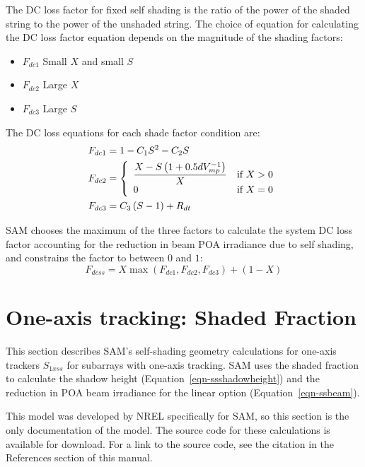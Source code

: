 \documentclass[12pt,letterpaper]{article}
\begin{document}
The DC loss factor for fixed self shading is the ratio of the power of the shaded string to the power of the unshaded string. The choice of equation for calculating the DC loss factor equation depends on the magnitude of the shading factors:
\begin{itemize}
\item $F_{dc1}$ \quad Small $X$ and small $S$
\item $F_{dc2}$ \quad Large $X$
\item $F_{dc3}$ \quad Large $S$
\end{itemize}

The DC loss equations for each shade factor condition are:
\begin{align}
F_{dc1} &= 1-C_1S^2-C_2S \notag\\ %
F_{dc2} &= 
\left\{
   \begin{array}{ll}
      \dfrac{X-S\left(1+0.5 d V^{-1}_{mp}\right)}{X} & \text{if $X>0$}\\
      0 & \text{if $X=0$}\\
   \end{array}
\right. \notag\\ %
F_{dc3} &= C_3\left(S-1\right)+R_{dt} %
\end{align}

SAM chooses the maximum of the three factors to calculate the system DC loss factor accounting for the reduction in beam POA irradiance due to self shading, and constrains the factor to between $0$ and $1$:
\begin{equation}\label{eqn-selfshadedcderate}
F_{dcss}=X\max\left(F_{dc1},F_{dc2},F_{dc3}\right)+(1-X)
\end{equation}

\section{One-axis tracking: Shaded Fraction}\label{sec_selfshad1x}

This section describes SAM's self-shading geometry calculations for one-axis trackers $S_{1xss}$ for subarrays with one-axis tracking. SAM uses the shaded fraction to calculate the shadow height (Equation~\ref{eqn-ssshadowheight}) and the reduction in POA beam irradiance for the linear option (Equation~\ref{eqn-ssbeam}).

This model was developed by NREL specifically for SAM, so this section is the only documentation of the model. The source code for these calculations is available for download. For a link to the source code, see the \citet{source} citation in the References section of this manual.
\end{document}
